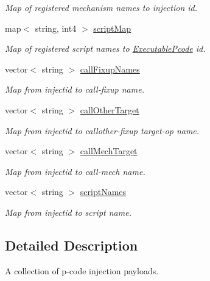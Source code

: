 \begin{DoxyCompactItemize}
\begin{DoxyCompactList}\small\item\em Map of registered mechanism names to injection id. \end{DoxyCompactList}\item 
map$<$ string, int4 $>$ \mbox{\hyperlink{class_pcode_inject_library_a6c35289813560d4552f2464e1a804bc2}{script\+Map}}
\begin{DoxyCompactList}\small\item\em Map of registered script names to \mbox{\hyperlink{class_executable_pcode}{Executable\+Pcode}} id. \end{DoxyCompactList}\item 
vector$<$ string $>$ \mbox{\hyperlink{class_pcode_inject_library_a6546a7f92bd290b988efe959e3fd84f6}{call\+Fixup\+Names}}
\begin{DoxyCompactList}\small\item\em Map from injectid to call-\/fixup name. \end{DoxyCompactList}\item 
vector$<$ string $>$ \mbox{\hyperlink{class_pcode_inject_library_aac7dd876176633699593928163eb9336}{call\+Other\+Target}}
\begin{DoxyCompactList}\small\item\em Map from injectid to callother-\/fixup target-\/op name. \end{DoxyCompactList}\item 
vector$<$ string $>$ \mbox{\hyperlink{class_pcode_inject_library_a082b2a2b26f725dc6bc43224e528664d}{call\+Mech\+Target}}
\begin{DoxyCompactList}\small\item\em Map from injectid to call-\/mech name. \end{DoxyCompactList}\item 
vector$<$ string $>$ \mbox{\hyperlink{class_pcode_inject_library_ac78d668f99a551401c0a88ad6ea52a45}{script\+Names}}
\begin{DoxyCompactList}\small\item\em Map from injectid to script name. \end{DoxyCompactList}\end{DoxyCompactItemize}


\subsection{Detailed Description}
A collection of p-\/code injection payloads. 

